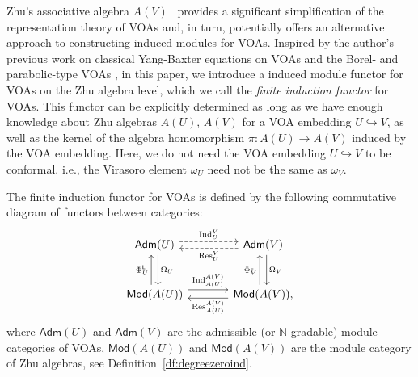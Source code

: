 \documentclass[12pt,a4paper,reqno]{amsart}
\numberwithin{equation}{section}
\numberwithin{equation}{section}
\theoremstyle{definition}
\newcommand{\N}{\mathbb{N}}
\def \ra {\rightarrow}
\def \om{\omega}
\def\hr{\hookrightarrow}
\def\Ind{\mathrm{Ind}}
\def\Res{\mathrm{Res}}
\def\Om{\Omega}
\def\Ind{\mathrm{Ind}}
\def\adm{\mathsf{Adm}}
\def\LL{\mathsf{L}}
\begin{document}
	Zhu’s associative algebra $A(V)$~\cite{Z} provides a significant simplification of the representation theory of VOAs and, in turn, potentially offers an alternative approach to constructing induced modules for VOAs.
Inspired by the author's previous work on classical Yang-Baxter equations on VOAs \cite{BGL25,BGLW23} and the Borel- and parabolic-type VOAs \cite{Liu24}, in this paper, we introduce a induced module functor for VOAs on the Zhu algebra \cite{Z} level, which we call the {\em finite induction functor} for VOAs. This functor can be explicitly determined as long as we have enough knowledge about Zhu algebras $A(U)$, $A(V)$ for a VOA embedding $U\hr V$, as well as the kernel of the algebra homomorphism $\pi: A(U)\ra A(V)$ induced by the VOA embedding. Here, we do not need the VOA embedding $U\hr V$ to be conformal. i.e., the Virasoro element $\om_U$ need not be the same as  $\om_V$. 
	
The finite induction functor for VOAs is defined by the following commutative diagram of functors between categories: 
		\begin{equation}\label{eq:inddiagram0}
			\begin{tikzcd}[scale=1.5,row sep=large, column sep = large]
				\mathsf{Adm}(U)\arrow[r,dashed,shift left=2pt,"\mathrm{Ind}^V_U"]\arrow[d,shift left=2pt,"\Om_U"]& \mathsf{Adm}(V)\arrow[l,dashed,shift left=2pt,"\mathrm{Res}^V_U"]\arrow[d,shift left=2pt,"\Om_V"]\\
				\mathsf{Mod}(A(U))\arrow[r,shift left=3pt,"\mathrm{Ind}^{A(V)}_{A(U)}"]\arrow[u,shift left=2pt,"\Phi_U^\LL"]& \mathsf{Mod}(A(V)), \arrow[l,shift left=2pt,"\mathrm{Res}^{A(V)}_{A(U)}"]\arrow[u,shift left=2pt,"\Phi_V^\LL"]
			\end{tikzcd}
		\end{equation}
where $\adm(U)$ and $\adm(V)$ are the admissible (or $\N$-gradable) module categories of VOAs, $	\mathsf{Mod}(A(U))$ and $\mathsf{Mod}(A(V))$ are the module category of Zhu algebras, see Definition~\ref{df:degreezeroind}. 

\end{document}
